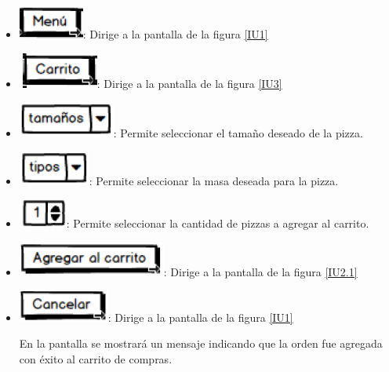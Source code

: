 	\begin{itemize}
		
		\item \includegraphics[scale=0.500]{imagenes/iconografia/Menu.png}: Dirige a la pantalla de la figura \ref{IU1}
		\item \includegraphics[scale=0.500]{imagenes/iconografia/Carrito.png}: Dirige a la pantalla de la figura \ref{IU3}
		\item \includegraphics[scale=0.500]{imagenes/iconografia/Tamanos.png}: Permite seleccionar el tamaño deseado de la pizza.
		\item \includegraphics[scale=0.500]{imagenes/iconografia/Tipos.png}: Permite seleccionar la masa deseada para la pizza.
		\item \includegraphics[scale=0.500]{imagenes/iconografia/Cantidad.png}: Permite seleccionar la cantidad de pizzas a agregar al carrito.
		\item \includegraphics[scale=0.500]{imagenes/iconografia/AgregarCarrito.png}: Dirige a la pantalla de la figura \ref{IU2.1}
		\item \includegraphics[scale=0.500]{imagenes/iconografia/Cancelar.png}: Dirige a la pantalla de la figura \ref{IU1}
		
		
		En la pantalla se mostrará un mensaje indicando que la orden fue agregada con éxito al carrito de compras.
		

\end{itemize}
